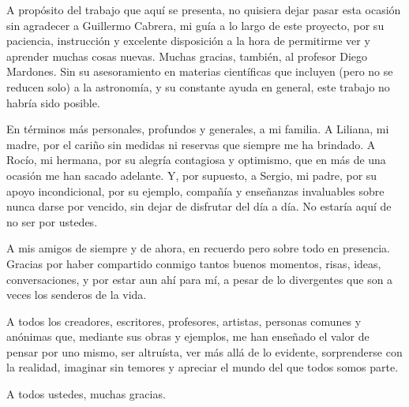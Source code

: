 \documentclass[upright, contnum]{umemoria}
\begin{document}
\begin{thanks}
A propósito del trabajo que aquí se presenta, no quisiera dejar pasar esta ocasión sin agradecer a Guillermo Cabrera, mi guía a lo largo de este proyecto, por su paciencia, instrucción y excelente disposición a la hora de permitirme ver y aprender muchas cosas nuevas. Muchas gracias, también, al profesor Diego Mardones. Sin su asesoramiento en materias científicas que incluyen (pero no se reducen solo) a la astronomía, y su constante ayuda en general, este trabajo no habría sido posible.

En términos más personales, profundos y generales, a mi familia. A Liliana, mi madre, por el cariño sin medidas ni reservas que siempre me ha brindado. A Rocío, mi hermana, por su alegría contagiosa y optimismo, que en más de una ocasión me han sacado adelante. Y, por supuesto, a Sergio, mi padre, por su apoyo incondicional, por su ejemplo, compañía y enseñanzas invaluables sobre nunca darse por vencido, sin dejar de disfrutar del día a día. No estaría aquí de no ser por ustedes.

A mis amigos de siempre y de ahora, en recuerdo pero sobre todo en presencia. Gracias por haber compartido conmigo tantos buenos momentos, risas, ideas, conversaciones, y por estar aun ahí para mí, a pesar de lo divergentes que son a veces los senderos de la vida.

A todos los creadores, escritores, profesores, artistas, personas comunes y anónimas que, mediante sus obras y ejemplos, me han enseñado el valor de pensar por uno mismo, ser altruísta, ver más allá de lo evidente, sorprenderse con la realidad, imaginar sin temores y apreciar el mundo del que todos somos parte.

A todos ustedes, muchas gracias.
\end{thanks}

\cleardoublepage
\begin{spacing}{1}
\tableofcontents
\listoffigures
\end{spacing}

\mainmatter








\nocite{*}



\appendix
\end{document}
